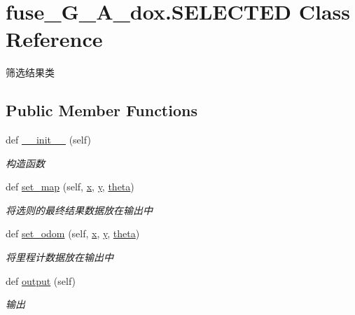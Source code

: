 \hypertarget{classfuse___g___a__dox_1_1_s_e_l_e_c_t_e_d}{}\section{fuse\+\_\+\+G\+\_\+\+A\+\_\+dox.\+S\+E\+L\+E\+C\+T\+ED Class Reference}
\label{classfuse___g___a__dox_1_1_s_e_l_e_c_t_e_d}


筛选结果类  


\subsection*{Public Member Functions}
\begin{DoxyCompactItemize}
\item 
def \hyperlink{classfuse___g___a__dox_1_1_s_e_l_e_c_t_e_d_aa6bcac8e79b063b09e554afc8ff393ab}{\+\_\+\+\_\+init\+\_\+\+\_\+} (self)
\begin{DoxyCompactList}\small\item\em 构造函数 \end{DoxyCompactList}\item 
def \hyperlink{classfuse___g___a__dox_1_1_s_e_l_e_c_t_e_d_a10e84f2e5b5060a7b09807762ac147ce}{set\+\_\+map} (self, \hyperlink{classfuse___g___a__dox_1_1_s_e_l_e_c_t_e_d_a9711f3c3729c12cacd17eb7821ec98a0}{x}, \hyperlink{classfuse___g___a__dox_1_1_s_e_l_e_c_t_e_d_a97b55edbf6512d9c686bee70666f5566}{y}, \hyperlink{classfuse___g___a__dox_1_1_s_e_l_e_c_t_e_d_a374cb0ab136265b1a493fa6f482b1349}{theta})
\begin{DoxyCompactList}\small\item\em 将选则的最终结果数据放在输出中 \end{DoxyCompactList}\item 
def \hyperlink{classfuse___g___a__dox_1_1_s_e_l_e_c_t_e_d_aa57c55051e01b06fb42bf4c0fb37772f}{set\+\_\+odom} (self, \hyperlink{classfuse___g___a__dox_1_1_s_e_l_e_c_t_e_d_a9711f3c3729c12cacd17eb7821ec98a0}{x}, \hyperlink{classfuse___g___a__dox_1_1_s_e_l_e_c_t_e_d_a97b55edbf6512d9c686bee70666f5566}{y}, \hyperlink{classfuse___g___a__dox_1_1_s_e_l_e_c_t_e_d_a374cb0ab136265b1a493fa6f482b1349}{theta})
\begin{DoxyCompactList}\small\item\em 将里程计数据放在输出中 \end{DoxyCompactList}\item 
def \hyperlink{classfuse___g___a__dox_1_1_s_e_l_e_c_t_e_d_a8efba27e917f06d97362295d99021f24}{output} (self)
\begin{DoxyCompactList}\small\item\em 输出 \end{DoxyCompactList}\end{DoxyCompactItemize}
